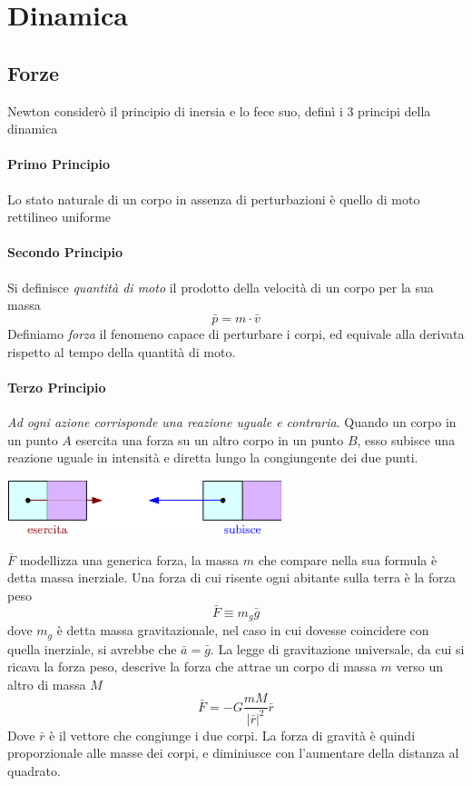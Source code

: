 \documentclass[10pt, letterpaper]{report}
\begin{document}
\chapter{Dinamica}
\section{Forze}
Newton considerò il principio di inersia e lo fece suo, definì i 3 principi della dinamica
\subsubsection{Primo Principio}
Lo stato naturale di un corpo in assenza di perturbazioni è quello di moto rettilineo uniforme 
\subsubsection{Secondo Principio}
 Si definisce \textit{quantità di moto} il prodotto della velocità di un corpo per la sua massa 
$$ \bar p = m\cdot \bar v$$ 
Definiamo \textit{forza} il fenomeno capace di perturbare i corpi, ed equivale alla derivata rispetto al tempo 
della quantità di moto. 
\subsubsection{Terzo Principio}
\textit{Ad ogni azione corrisponde una reazione uguale e contraria}. Quando un corpo in un punto $A$ esercita una forza 
su un altro corpo in un punto $B$, esso subisce una reazione uguale in intensità e diretta lungo la 
congiungente dei due punti.\begin{center}
    \includegraphics[width=0.6\textwidth]{images/terzoPrincipio.eps}
\end{center}
$\bar F$ modellizza una generica forza, la massa $m$ che compare nella sua formula è detta 
massa inerziale. Una forza di cui risente ogni abitante sulla terra è la forza peso 
$$ \bar F \equiv m_g\bar g$$
dove $m_g$ è detta massa gravitazionale, nel caso in cui dovesse coincidere con quella 
inerziale, si avrebbe che $\bar a = \bar g$. La legge di gravitazione universale, da cui si ricava la 
forza peso, descrive la forza che attrae un corpo di massa $m$ verso un altro di massa $M$
$$ \bar F = -G\frac{mM}{|\bar r|^2}\bar r$$
Dove $\bar r$ è il vettore che congiunge i due corpi. La forza di gravità è quindi proporzionale alle masse dei 
corpi, e diminiusce con l'aumentare della distanza al quadrato.
\end{document}
